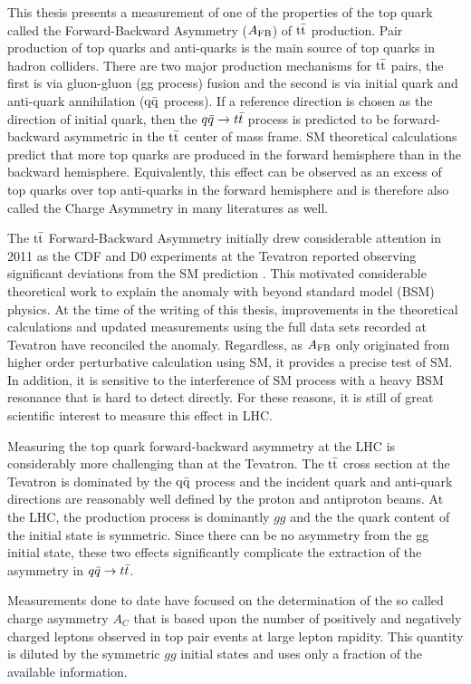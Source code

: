 This thesis presents a measurement of one of the properties of the top quark called the Forward-Backward Asymmetry ($A_{\mathrm{FB}}$) of $\mathrm{t}\bar{\mathrm{t}}$ production. Pair production of top quarks and anti-quarks is the main source of top quarks in hadron colliders. There are two major production mechanisms for $\mathrm{t}\bar{\mathrm{t}}$ pairs, the first is via gluon-gluon (gg process) fusion and the second is via initial quark and anti-quark annihilation ($\mathrm{q \bar{q}}$ process). If a reference direction is chosen as the direction of initial quark, then the $q\bar q \rightarrow t \bar t$ process is predicted to be forward-backward asymmetric in the $\mathrm{t}\bar{\mathrm{t}}$ center of mass frame.  SM theoretical calculations predict that more top quarks are produced in the forward hemisphere than in the backward hemisphere. Equivalently, this effect can be observed as an excess of top quarks over top anti-quarks in the forward hemisphere and is therefore also called the Charge Asymmetry in many literatures as well. 

The $\mathrm{t}\bar{\mathrm{t}}$ Forward-Backward Asymmetry initially drew considerable attention in 2011 as the CDF and D0 experiments \cite{cdf,d0} at the Tevatron reported observing significant deviations from the SM prediction \cite{Kuhn:1998kw, Kuhn:2011ri, AguilarSaavedra:2012rx}. This motivated considerable theoretical work to explain the anomaly with beyond standard model (BSM) physics. At the time of the writing of this thesis, improvements in the theoretical calculations and updated measurements using the full data sets recorded at Tevatron \cite{Abazov:2014cca,CDF2016,tevatron_combine} have reconciled the anomaly. Regardless, as $A_{\mathrm{FB}}$ only originated from higher order perturbative calculation using SM, it provides a precise test of SM. In addition, it is sensitive to the interference of SM process with a heavy BSM resonance that is hard to detect directly. For these reasons, it is still of great scientific interest to measure this effect in LHC.

Measuring the top quark forward-backward asymmetry at the LHC is considerably more challenging than at the Tevatron.  The $\mathrm{t}\bar{\mathrm{t}}$ cross section at the Tevatron is dominated by the $\mathrm{q \bar{q}}$ process and the incident quark and anti-quark directions are reasonably well defined by the proton and antiproton beams. At the LHC, the production process is dominantly $gg$ and the the quark content of the initial state is symmetric. Since there can be no asymmetry from the gg initial state, these two effects significantly complicate the extraction of the asymmetry in $q\bar q \rightarrow t \bar t$.  

Measurements \cite{ATLAS_measurement,CMS_measurement,Aad:2016ove} done to date have focused on the determination of the so called charge asymmetry $A_C$ that is based upon the number of positively and negatively charged leptons observed in top pair events at large lepton rapidity. This quantity is diluted by the symmetric $gg$ initial states and uses only a fraction of the available information. 

